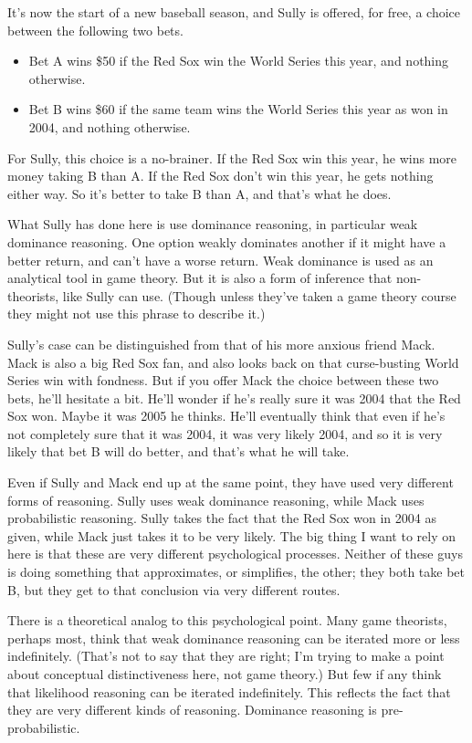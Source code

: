 \documentclass[
  11pt,
]{book}
\providecommand{\tightlist}{%
  \setlength{\itemsep}{0pt}\setlength{\parskip}{0pt}}
\begin{document}
It's now the start of a new baseball season, and Sully is offered, for free, a choice between the following two bets.

\begin{itemize}
\tightlist
\item
  Bet A wins \$50 if the Red Sox win the World Series this year, and nothing otherwise.
\item
  Bet B wins \$60 if the same team wins the World Series this year as won in 2004, and nothing otherwise.
\end{itemize}

For Sully, this choice is a no-brainer. If the Red Sox win this year, he wins more money taking B than A. If the Red Sox don't win this year, he gets nothing either way. So it's better to take B than A, and that's what he does.

What Sully has done here is use dominance reasoning, in particular weak dominance reasoning. One option weakly dominates another if it might have a better return, and can't have a worse return. Weak dominance is used as an analytical tool in game theory. But it is also a form of inference that non-theorists, like Sully can use. (Though unless they've taken a game theory course they might not use this phrase to describe it.)

Sully's case can be distinguished from that of his more anxious friend Mack. Mack is also a big Red Sox fan, and also looks back on that curse-busting World Series win with fondness. But if you offer Mack the choice between these two bets, he'll hesitate a bit. He'll wonder if he's really sure it was 2004 that the Red Sox won. Maybe it was 2005 he thinks. He'll eventually think that even if he's not completely sure that it was 2004, it was very likely 2004, and so it is very likely that bet B will do better, and that's what he will take.

Even if Sully and Mack end up at the same point, they have used very different forms of reasoning. Sully uses weak dominance reasoning, while Mack uses probabilistic reasoning. Sully takes the fact that the Red Sox won in 2004 as given, while Mack just takes it to be very likely. The big thing I want to rely on here is that these are very different psychological processes. Neither of these guys is doing something that approximates, or simplifies, the other; they both take bet B, but they get to that conclusion via very different routes.

There is a theoretical analog to this psychological point. Many game theorists, perhaps most, think that weak dominance reasoning can be iterated more or less indefinitely. (That's not to say that they are right; I'm trying to make a point about conceptual distinctiveness here, not game theory.) But few if any think that likelihood reasoning can be iterated indefinitely. This reflects the fact that they are very different kinds of reasoning. Dominance reasoning is pre-probabilistic.
\end{document}
